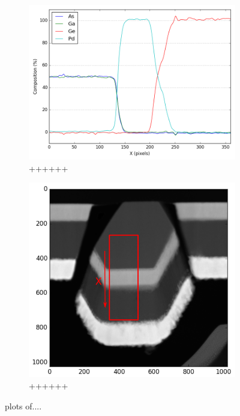 \begin{figure}
\begin{subfigure}{.5\textwidth}
			\includegraphics[width=\linewidth]{fig/q/1_all_abscorr2}
			\caption{++++++}
			\label{fig:zeta_area1_all}
	\end{subfigure}%
	\begin{subfigure}{.5\textwidth}
		\centering
		\newlength\imageheight
		\includegraphics[width=.68\linewidth]{fig/q/1_overview3}
		\caption{++++++}
		\label{fig:zeta_area1_overview}
	\end{subfigure}
	\caption{plots of....}
	\label{fig:zeta_area1}
\end{figure}

